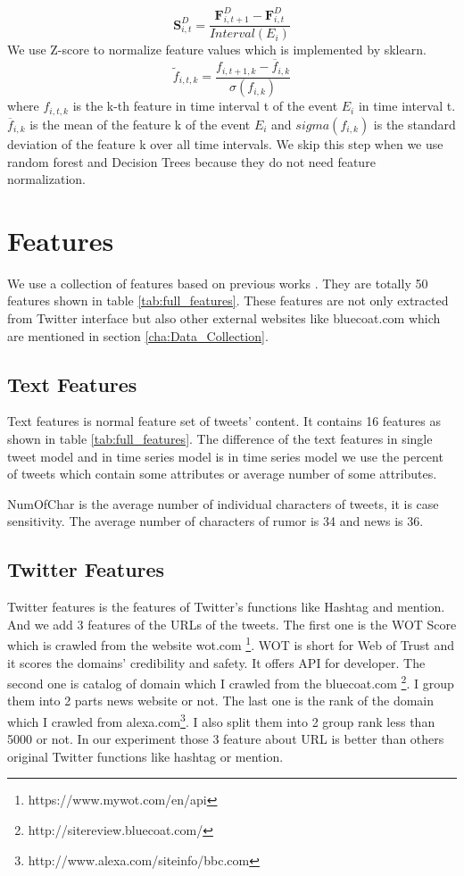 \begin{equation}
\textbf{S}^D_{i,t}=\frac{\textbf{F}^D_{i,t+1}-\textbf{F}^D_{i,t}}{Interval(E_i)}
\end{equation}
We use Z-score to normalize feature values which is implemented by sklearn.
\begin{equation}
\widetilde{f}_{i,t,k}=\frac{f_{i,t+1,k}-\overline{f}_{i,k}}{\sigma(f_{i,k})}
\end{equation}
where $f_{i,t,k}$ is the k-th feature in time interval t of the event $E_i$ in time interval t. $\overline{f}_{i,k}$ is the mean of the feature k of the event $E_i$ and $sigma(f_{i,k})$ is the standard deviation of the feature k over all time intervals. We skip this step when we use random forest and Decision Trees because they do not need feature normalization.

  \section{ Features} 
 
 We use a collection of features based on previous works  
\cite{castillo2011information}\cite{gupta2014tweetcred} \cite{yang2012automatic}\cite{liu2015real}\cite{madetecting}\cite{mendoza2010twitter}\cite{ma2015detect}\cite{wu2015false}\cite{jin2013epidemiological}. They are totally 50 features shown in table \ref{tab:full_features}. These features are not only extracted from Twitter interface but also other external websites like bluecoat.com which are mentioned in section \ref{cha:Data_Collection}. 
\subsection{Text Features}
Text features is normal feature set of tweets' content. It contains 16 features as shown in table \ref{tab:full_features}. The difference of the text features in single tweet model and in time series model is in time series model we use the percent of tweets which contain some attributes or average number of some attributes. 

NumOfChar is the average number of individual characters of tweets, it is case sensitivity. The average number of characters of rumor is 34 and news is 36.
\subsection{Twitter Features}
Twitter features is the features of Twitter's functions like Hashtag and mention.
And we add 3 features of the URLs of the tweets. The first one is the WOT Score which is crawled from the website wot.com \footnote{https://www.mywot.com/en/api}. WOT is short for Web of Trust and it scores the domains' credibility and safety. It offers API for developer. The second one is catalog of domain which I crawled from the bluecoat.com \footnote{http://sitereview.bluecoat.com/}. I group them into 2 parts news website or not. The last one is the rank of the domain which I crawled from alexa.com\footnote{http://www.alexa.com/siteinfo/bbc.com}. I also split them into 2 group rank less than 5000 or not. In our experiment those 3 feature about URL is better than others original Twitter functions like hashtag or mention.
